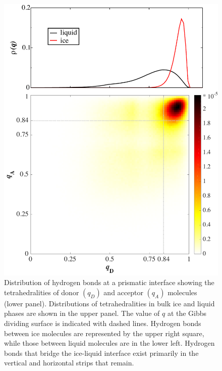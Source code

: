 \begin{figure}
\includegraphics[width=5in]{Figures/hbtet.pdf}
\caption{\label{fig:tetHBMatrix} Distribution of hydrogen bonds at a
  prismatic interface showing the tetrahedralities of donor $(q_D)$
  and acceptor $(q_A)$ molecules (lower panel). Distributions of
  tetrahedralities in bulk ice and liquid phases are shown in the
  upper panel. The value of $q$ at the Gibbs dividing surface is
  indicated with dashed lines. Hydrogen bonds between ice molecules
  are represented by the upper right square, while those between
  liquid molecules are in the lower left.  Hydrogen bonds that bridge
  the ice-liquid interface exist primarily in the vertical and
  horizontal strips that remain.}
\end{figure}

